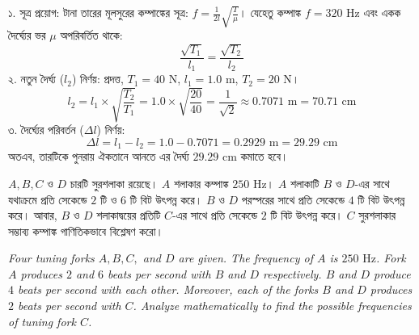 \documentclass[12pt, a4paper]{article}
\begin{document}
\vspace{1em}

\begin{tcolorbox}[solutionbox={সমাধান (Solution)}]
\noindent
১. সূত্র প্রয়োগ: টানা তারের মূলসুরের কম্পাঙ্কের সূত্র: $f = \frac{1}{2l}\sqrt{\frac{T}{\mu}}$। যেহেতু কম্পাঙ্ক $f = 320\text{ Hz}$ এবং একক দৈর্ঘ্যের ভর $\mu$ অপরিবর্তিত থাকে:
\[ \frac{\sqrt{T_1}}{l_1} = \frac{\sqrt{T_2}}{l_2} \]
২. নতুন দৈর্ঘ্য ($l_2$) নির্ণয়: প্রদত্ত, $T_1 = 40\text{ N}$, $l_1 = 1.0\text{ m}$, $T_2 = 20\text{ N}$।
\[ l_2 = l_1 \times \sqrt{\frac{T_2}{T_1}} = 1.0 \times \sqrt{\frac{20}{40}} = \frac{1}{\sqrt{2}} \approx 0.7071\text{ m} = 70.71\text{ cm} \]
৩. দৈর্ঘ্যের পরিবর্তন ($\Delta l$) নির্ণয়:
\[ \Delta l = l_1 - l_2 = 1.0 - 0.7071 = 0.2929\text{ m} = 29.29\text{ cm} \]
অতএব, তারটিকে পুনরায় ঐকতানে আনতে এর দৈর্ঘ্য $29.29\text{ cm}$ কমাতে হবে।
\end{tcolorbox}

\vspace{1.5em}

\begin{tcolorbox}[questionbox={প্রশ্ন (Question) 4}]
\noindent
$A, B, C$ ও $D$ চারটি সুরশলাকা রয়েছে। $A$ শলাকার কম্পাঙ্ক $250\text{ Hz}$। $A$ শলাকাটি $B$ ও $D$-এর সাথে যথাক্রমে প্রতি সেকেন্ডে $2$ টি ও $6$ টি বিট উৎপন্ন করে। $B$ ও $D$ পরস্পরের সাথে প্রতি সেকেন্ডে $4$ টি বিট উৎপন্ন করে। আবার, $B$ ও $D$ শলাকাদ্বয়ের প্রতিটি $C$-এর সাথে প্রতি সেকেন্ডে $2$ টি বিট উৎপন্ন করে। $C$ সুরশলাকার সম্ভাব্য কম্পাঙ্ক গাণিতিকভাবে বিশ্লেষণ করো।

\vspace{0.8em}
\begin{english}
\noindent\textit{\color{darkgray}
Four tuning forks $A, B, C,$ and $D$ are given. The frequency of $A$ is $250\text{ Hz}$. Fork $A$ produces $2$ and $6$ beats per second with $B$ and $D$ respectively. $B$ and $D$ produce $4$ beats per second with each other. Moreover, each of the forks $B$ and $D$ produces $2$ beats per second with $C$. Analyze mathematically to find the possible frequencies of tuning fork $C$.
}
\end{english}
\end{tcolorbox}

\vspace{1em}
\end{document}
